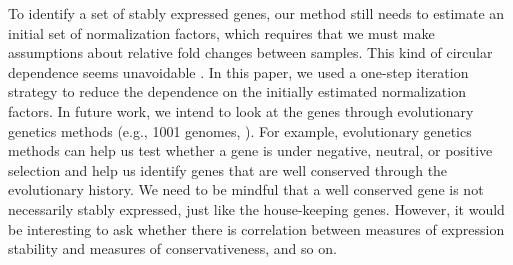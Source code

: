 \documentclass[letterpaper,12pt]{article}
\begin{document}
			
			
			To identify a set of stably expressed genes, our method still needs to estimate
			an initial set of normalization factors, which requires that we must make assumptions 
			about relative fold changes between samples. This kind of circular dependence
			seems unavoidable \citep{vandesompele2002accurate}. In this paper, we used a
			one-step iteration strategy to reduce the dependence on the initially
			estimated normalization factors.  
			In future work, we intend to look at the genes through evolutionary genetics
			methods (e.g., 1001 genomes, \cite{weigel20091001}).  For example, evolutionary 
			genetics methods can
			help us test whether a gene is under negative, neutral, or positive selection
			and help us identify genes that are well conserved through the evolutionary
			history. We need to be mindful that a well conserved gene is not necessarily
			stably expressed, just like the house-keeping genes. However, it would be
			interesting to ask whether there is correlation between measures of expression
			stability and measures of conservativeness, and so on.
			
\end{document}
